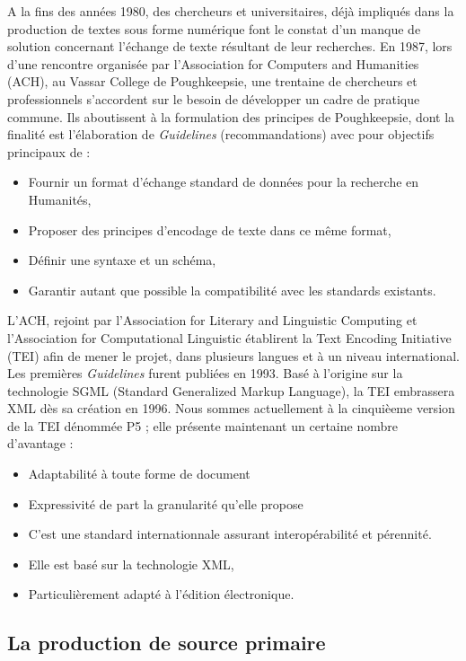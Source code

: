 \documentclass[12pt,a4paper,oneside]{book} %
\begin{document}
A la fins des années 1980, des chercheurs et universitaires, déjà impliqués dans la production de textes sous forme numérique font le constat d'un manque de solution concernant l'échange de texte résultant de leur recherches. En 1987, lors d'une rencontre organisée par l'Association for Computers and Humanities (ACH), au Vassar College de Poughkeepsie, une trentaine de chercheurs et professionnels s'accordent sur le besoin de développer un cadre de pratique commune. Ils aboutissent à la formulation des principes de Poughkeepsie, dont la finalité est l'élaboration de \textit{Guidelines} (recommandations) avec pour objectifs principaux de :
\begin{itemize}
\item Fournir un format d'échange standard de données pour la recherche en Humanités,
\item Proposer des principes d'encodage de texte dans ce même format,
\item Définir une syntaxe et un schéma,
\item Garantir autant que possible la compatibilité avec les standards existants.
\end{itemize}

L'ACH, rejoint par l'Association for Literary and Linguistic Computing et l'Association for Computational Linguistic établirent la Text Encoding Initiative (TEI) afin de mener le projet, dans plusieurs langues et à un niveau international. Les premières \textit{Guidelines} furent publiées en 1993.
Basé à l'origine sur la technologie SGML (Standard Generalized Markup Language), la TEI embrassera XML dès sa création en 1996. Nous sommes actuellement à la cinquièeme version de la TEI dénommée P5 ; elle présente maintenant un certaine nombre d'avantage : 

\begin{itemize}
\item Adaptabilité à toute forme de document
\item Expressivité de part la granularité qu'elle propose
\item C'est une standard internationnale assurant interopérabilité et pérennité. 
\item Elle est basé sur la technologie XML,
\item Particulièrement adapté à l'édition électronique.
\end{itemize}

\subsection{La production de source primaire}
\end{document}

